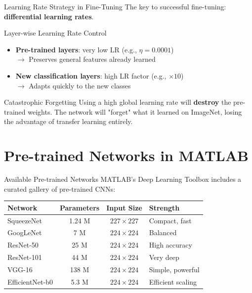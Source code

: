 \documentclass[aspectratio=169,xcolor=dvipsnames]{beamer}
\begin{document}
\begin{frame}{Learning Rate Strategy in Fine-Tuning}
    The key to successful fine-tuning: \textbf{differential learning rates}.

    \begin{block}{Layer-wise Learning Rate Control}
        \begin{itemize}
            \item \textbf{Pre-trained layers}: very low LR (e.g., $\eta = 0.0001$) \\
                $\rightarrow$ Preserves general features already learned
            \item \textbf{New classification layers}: high LR factor (e.g., $\times 10$) \\
                $\rightarrow$ Adapts quickly to the new classes
        \end{itemize}
    \end{block}

    \begin{alertblock}{Catastrophic Forgetting}
        Using a high global learning rate will \textbf{destroy} the pre-trained weights. The network will "forget" what it learned on ImageNet, losing the advantage of transfer learning entirely.
    \end{alertblock}
\end{frame}

\section{Pre-trained Networks in MATLAB}

\begin{frame}{Available Pre-trained Networks}
    MATLAB's Deep Learning Toolbox includes a curated gallery of pre-trained CNNs:
    \begin{tabular}{lccl}
        \toprule
        \textbf{Network} & \textbf{Parameters} & \textbf{Input Size} & \textbf{Strength} \\
        \midrule
        SqueezeNet       & 1.24 M   & $227\times227$ & Compact, fast \\
        GoogLeNet        & 7 M      & $224\times224$ & Balanced \\
        ResNet-50        & 25 M     & $224\times224$ & High accuracy \\
        ResNet-101       & 44 M     & $224\times224$ & Very deep \\
        VGG-16           & 138 M    & $224\times224$ & Simple, powerful \\
        EfficientNet-b0  & 5.3 M    & $224\times224$ & Efficient scaling \\
        \bottomrule
    \end{tabular}

   
\end{frame}
\end{document}
